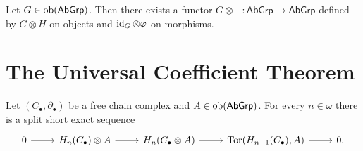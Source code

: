 Let $G \in \operatorname{ob}(\mathsf{AbGrp})$. Then there exists a functor $G \otimes - : \mathsf{AbGrp} \to \mathsf{AbGrp}$ defined by $G \otimes H$ on objects and $\operatorname{id}_G \otimes \varphi$ on morphisms. 

\section*{The Universal Coefficient Theorem}
\begin{theorem}
	Let $(C_\bullet,\partial_\bullet)$ be a free chain complex and $A \in \operatorname{ob}(\mathsf{AbGrp})$. For every $n \in \omega$ there is a split short exact sequence
	\begin{equation*}
		\begin{tikzcd}
			0 \arrow[r] & H_n(C_\bullet) \otimes A \arrow[r] & H_n(C_\bullet \otimes A) \arrow[r] & \Tor(H_{n - 1}(C_\bullet),A) \arrow[r] & 0.
		\end{tikzcd}
	\end{equation*}
	\label{thm:UCT}
\end{theorem}
